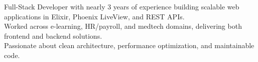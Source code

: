 

\begin{cvparagraph}
Full-Stack Developer with nearly 3 years of experience building scalable web applications in Elixir, Phoenix LiveView, and REST APIs. 
\\ Worked across e-learning, HR/payroll, and medtech domains, delivering both frontend and backend solutions. 
\\ Passionate about clean architecture, performance optimization, and maintainable code.
\end{cvparagraph}
